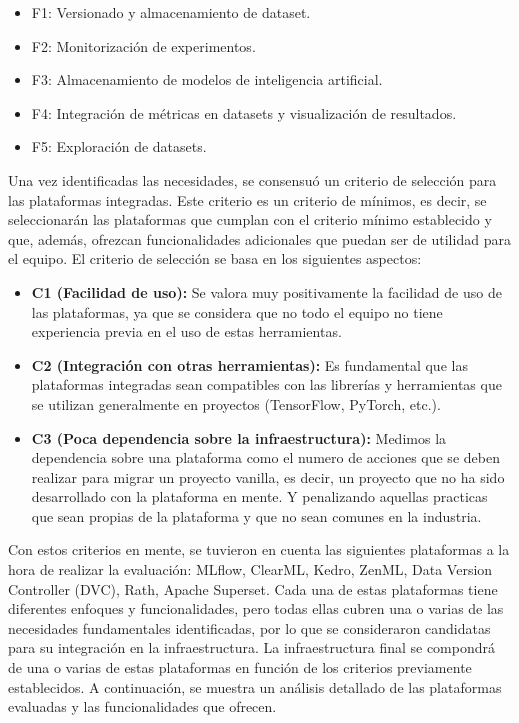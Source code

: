 \begin{itemize}
    \item F1: Versionado y almacenamiento de dataset.
    \item F2: Monitorización de experimentos.
    \item F3: Almacenamiento de modelos de inteligencia artificial.
    \item F4: Integración de métricas en datasets y visualización de resultados.
    \item F5: Exploración de datasets.
\end{itemize}

Una vez identificadas las necesidades, se consensuó un criterio de selección
para las plataformas integradas. Este criterio es un criterio de mínimos, es
decir, se seleccionarán las plataformas que cumplan con el criterio mínimo
establecido y que, además, ofrezcan funcionalidades adicionales que puedan
ser de utilidad para el equipo. El criterio de selección se basa en los
siguientes aspectos: 

\begin{itemize}
    \item \textbf{C1 (Facilidad de uso):} Se valora muy positivamente la facilidad de uso de las
    plataformas, ya que se considera que no todo el equipo no tiene experiencia
    previa en el uso de estas herramientas.
    \item \textbf{C2 (Integración con otras herramientas):} Es fundamental que las
    plataformas integradas sean compatibles con las librerías y herramientas
    que se utilizan generalmente en proyectos (TensorFlow, PyTorch, etc.).
    \item \textbf{C3 (Poca dependencia sobre la infraestructura):} Medimos la dependencia
    sobre una plataforma como el numero de acciones que se deben realizar para
    migrar un proyecto vanilla, es decir, un proyecto que no ha sido
    desarrollado con la plataforma en mente. Y penalizando aquellas practicas
    que sean propias de la plataforma y que no sean comunes en la industria.
\end{itemize}

Con estos criterios en mente, se tuvieron en cuenta las siguientes
plataformas a la hora de realizar la evaluación: MLflow, ClearML, Kedro, ZenML, Data Version Controller (DVC),
Rath, Apache Superset. Cada una de estas plataformas tiene diferentes enfoques y 
funcionalidades, pero todas ellas cubren una o varias de las necesidades fundamentales
identificadas, por lo que se consideraron candidatas para su integración en la
infraestructura. La infraestructura final se compondrá de una o varias de estas
plataformas en función de los criterios previamente establecidos. A continuación, se 
muestra un análisis detallado de las plataformas evaluadas y las funcionalidades que ofrecen.

